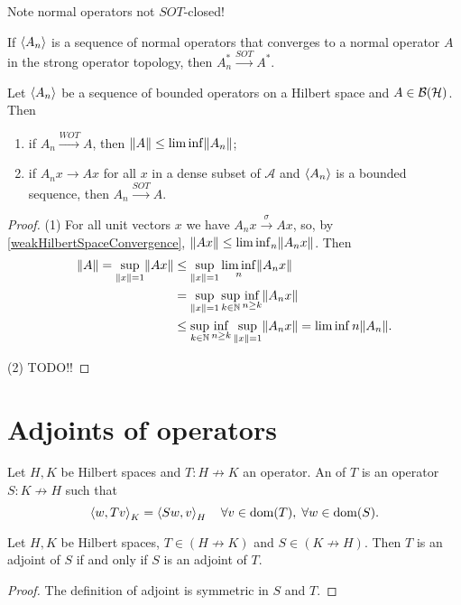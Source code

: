 Note normal operators not $SOT$-closed!
\begin{proposition}
If $\left\langle A_n \right\rangle$ is a sequence of normal operators that converges to a normal operator $A$ in the strong operator topology, then $A_n^* \overset{SOT}{\longrightarrow} A^*$.
\end{proposition}

\begin{proposition}
Let $\left\langle A_n \right\rangle$ be a sequence of bounded operators on a Hilbert space and $A\in\operatorname{\mathcal{B}}(\mathcal{H})$. Then
\begin{enumerate}
\item if $A_n \overset{WOT}{\longrightarrow} A$, then $\lVert A\rVert\leq \liminf\lVert A_n\rVert$;
\item if $A_nx \longrightarrow Ax$ for all $x$ in a dense subset of $\mathcal{A}$ and $\left\langle A_n \right\rangle$ is a bounded sequence, then $A_n \overset{SOT}{\longrightarrow} A$.
\end{enumerate}
\end{proposition}
\begin{proof}
(1) For all unit vectors $x$ we have $A_nx \overset{\sigma}{\longrightarrow} Ax$, so, by \ref{weakHilbertSpaceConvergence}, $\lVert Ax\rVert \leq \liminf_n\lVert A_nx\rVert$. Then
\begin{align*}
\lVert A\rVert = \sup_{\lVert x\rVert=1}\lVert Ax\rVert &\leq \sup_{\lVert x\rVert=1}\liminf_n\lVert A_nx\rVert \\
&= \sup_{\lVert x\rVert=1}\sup_{k\in \mathbb{N}}\inf_{n\geq k}\lVert A_nx\rVert \\
&\leq \sup_{k\in \mathbb{N}}\inf_{n\geq k}\sup_{\lVert x\rVert=1}\lVert A_nx\rVert = \liminf{n}\lVert A_n\rVert.
\end{align*}

(2) TODO!!
\end{proof}


\section{Adjoints of operators}
\begin{definition}
Let $H,K$ be Hilbert spaces and $T: H\not\to K$ an operator. An  of $T$ is an operator $S: K\not\to H$ such that
\[ \left\langle w,Tv \right\rangle_K = \left\langle S w,v \right\rangle_H \quad \forall v\in \operatorname{dom}(T),\; \forall w\in \operatorname{dom}(S). \]
\end{definition}

\begin{lemma} \label{adjointRequirementSymmetric}
Let $H,K$ be Hilbert spaces, $T\in (H\not\to K)$ and $S\in(K\not\to H)$. Then $T$ is an adjoint of $S$ \textup{if and only if} $S$ is an adjoint of $T$.
\end{lemma}
\begin{proof}
The definition of adjoint is symmetric in $S$ and $T$.
\end{proof}

